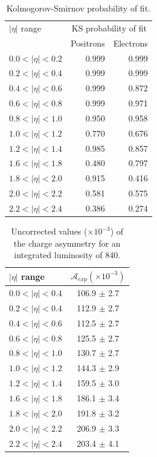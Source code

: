 \begin{table}[htbp]
 \begin{center}
 \begin{tabular}{lrr}
\toprule
$|\eta|$ range &  \multicolumn{2}{c}{KS probability of fit} \\
               & Positrons & Electrons \\
\midrule
$0.0<| \eta |<0.2$ & 0.999 & 0.999 \\ 
$0.2<| \eta |<0.4$ & 0.999 & 0.999 \\ 
$0.4<| \eta |<0.6$ & 0.999 & 0.872 \\ 
$0.6<| \eta |<0.8$ & 0.999 & 0.971 \\ 
$0.8<| \eta |<1.0$ & 0.950 & 0.958 \\ 
$1.0<| \eta |<1.2$ & 0.770 & 0.676 \\ 
$1.2<| \eta |<1.4$ & 0.985 & 0.857 \\ 
$1.6<| \eta |<1.8$ & 0.480 & 0.797 \\ 
$1.8<| \eta |<2.0$ & 0.915 & 0.416 \\ 
$2.0<| \eta |<2.2$ & 0.581 & 0.575 \\ 
$2.2<| \eta |<2.4$ & 0.386 & 0.274 \\ 
\bottomrule
 \end{tabular}
 \caption{\label{tab:ks2} Kolmogorov-Smirnov probability of fit.}
 \end{center}
\end{table}

\begin{table}[htbp]
  \begin{center}
    \begin{tabular}{lc}
\toprule
    $|\eta|$ range & $\mathcal{A}_{exp} (\times 10^{-3})$\\
    \midrule
    $0.0<|\eta|<0.4$ & 106.9 $\pm$ 2.7\\
    $0.2<|\eta|<0.4$ & 112.9 $\pm$ 2.7\\
    $0.4<|\eta|<0.6$ & 112.5 $\pm$ 2.7\\
    $0.6<|\eta|<0.8$ & 125.5 $\pm$ 2.7\\
    $0.8<|\eta|<1.0$ & 130.7 $\pm$ 2.7\\
    $1.0<|\eta|<1.2$ & 144.3 $\pm$ 2.9\\
    $1.2<|\eta|<1.4$ & 159.5 $\pm$ 3.0 \\
    $1.6<|\eta|<1.8$ & 186.1 $\pm$ 3.4\\
    $1.8<|\eta|<2.0$ & 191.8 $\pm$ 3.2\\
    $2.0<|\eta|<2.2$ & 206.9 $\pm$ 3.3\\
    $2.2<|\eta|<2.4$ & 203.4 $\pm$ 4.1\\
\bottomrule
    \end{tabular}
  \caption{\label{tab:uncorRes}Uncorrected values ($\times 10^{-3}$) of the
  charge asymmetry  for an integrated luminosity of \unit{840}{\invpb}. }
  \end{center}
\end{table}

